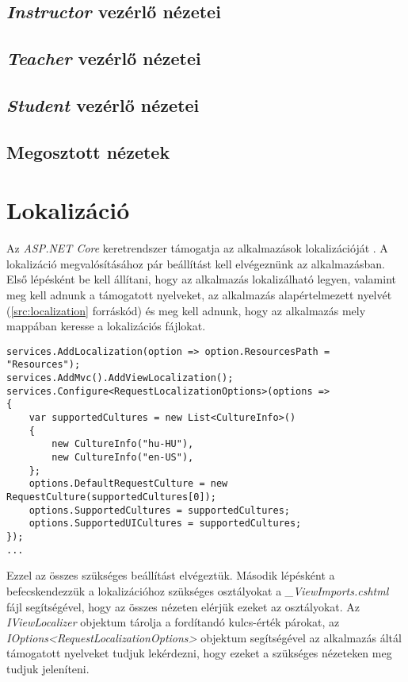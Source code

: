 \subsection{\emph{Instructor} vezérlő nézetei}
\subsection{\emph{Teacher} vezérlő nézetei}
\subsection{\emph{Student} vezérlő nézetei}
\subsection{Megosztott nézetek}
\section{Lokalizáció}
\label{sec:localization}
Az \emph{ASP.NET Core} keretrendszer támogatja az alkalmazások lokalizációját \cite{Localization}. A lokalizáció megvalósításához pár beállítást kell elvégeznünk az alkalmazásban. Első lépésként be kell állítani, hogy az alkalmazás lokalizálható legyen, valamint meg kell adnunk a támogatott nyelveket, az alkalmazás alapértelmezett nyelvét (\ref{src:localization} forráskód) és meg kell adnunk, hogy az alkalmazás mely mappában keresse a lokalizációs fájlokat.
\begin{lstlisting}[language={[Sharp]C}]
services.AddLocalization(option => option.ResourcesPath = "Resources");
services.AddMvc().AddViewLocalization();
services.Configure<RequestLocalizationOptions>(options =>
{
	var supportedCultures = new List<CultureInfo>()
	{
		new CultureInfo("hu-HU"),
		new CultureInfo("en-US"),
	};
	options.DefaultRequestCulture = new RequestCulture(supportedCultures[0]);
	options.SupportedCultures = supportedCultures;
	options.SupportedUICultures = supportedCultures;
});
...
\end{lstlisting}
Ezzel az összes szükséges beállítást elvégeztük. Második lépésként a befecskendezzük a lokalizációhoz szükséges osztályokat a \emph{\_ViewImports.cshtml} fájl segítségével, hogy az összes nézeten elérjük ezeket az osztályokat. Az \emph{IViewLocalizer} objektum tárolja a fordítandó kulcs-érték párokat, az \emph{IOptions<RequestLocalizationOptions>} objektum segítségével az alkalmazás áltál támogatott nyelveket tudjuk lekérdezni, hogy ezeket a szükséges nézeteken meg tudjuk jeleníteni.
